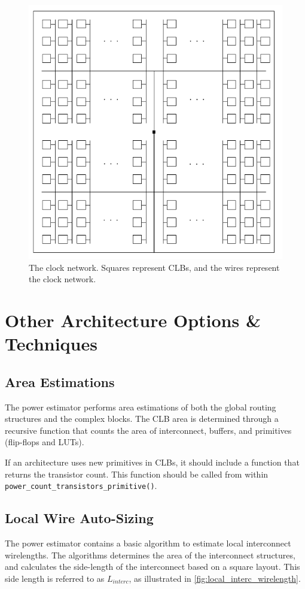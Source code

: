 \documentclass[letterpaper,twoside,10pt]{article}
\begin{document}
\begin{figure}[ht]
	\centering
	\includegraphics[scale=0.7]{images/clock_network}
	\caption{The clock network.  Squares represent CLBs, and the wires represent the clock network.}
	\label{fig:clock_network}
\end{figure}




\clearpage
\section{Other Architecture Options \& Techniques}
\subsection{Area Estimations} \label{sec:area_est}
The power estimator performs area estimations of both the global routing structures and the complex blocks.  The CLB area is determined through a recursive function that counts the area of interconnect, buffers, and primitives (flip-flops and LUTs).  

If an architecture uses new primitives in CLBs, it should include a function that returns the transistor count.  This function should be called from within \texttt{power\_count\_transistors\_primitive()}.

\subsection{Local Wire Auto-Sizing} \label{sec:local_wire_autosize}
The power estimator contains a basic algorithm to estimate local interconnect wirelengths.  The algorithms determines the area of the interconnect structures, and calculates the side-length of the interconnect based on a square layout.  This side length is referred to as $L_{interc}$, as illustrated in \autoref{fig:local_interc_wirelength}.
\end{document}
